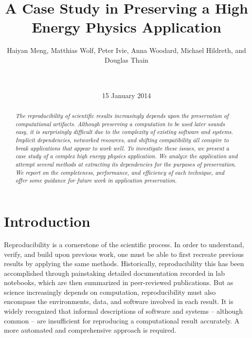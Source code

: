 \documentclass{acm_proc_article-sp}
\begin{document}
\title{A Case Study in Preserving a High Energy Physics Application}
\author{
Haiyan Meng, Matthias Wolf, Peter Ivie, Anna Woodard, Michael Hildreth, and Douglas Thain\\
\\
\\
}
\date{15 January 2014}
\maketitle

\begin{abstract}
\it The reproducibility of scientific results increasingly
depends upon the preservation of computational artifacts.
Although preserving a computation to be used later sounds
easy, it is surprisingly difficult due to the complexity
of existing software and systems.  Implicit dependencies,
networked resources, and shifting compatibility all conspire
to break applications that appear to work well.  To investigate
these issues, we present a case study of a complex high energy
physics application.  We analyze the application and attempt
several methods at extracting its dependencies for the purposes
of preservation.  We report on the completeness, performance,
and efficiency of each technique, and offer some guidance for
future work in application preservation.
\end{abstract}



\section{Introduction}

Reproducibility is a cornerstone of the scientific process.
In order to understand, verify, and build upon previous work,
one must be able to first recreate previous results by applying
the same methods. Historically, reproducibility this has been
accomplished through painstaking detailed documentation recorded
in lab notebooks, which are then summarized in peer-reviewed publications.
But as science increasingly depends on computation,
reproducibility must also encompass the environments, data, and software
involved in each result. It is widely recognized that informal
descriptions of software and systems -- although common -- are insufficient
for reproducing a computational result accurately.
A more automated and comprehensive approach is required.
\end{document}
